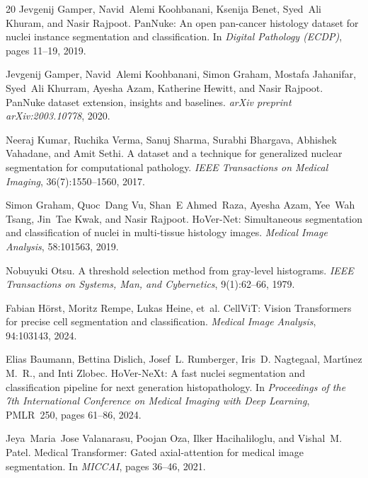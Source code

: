 \documentclass{article}
\begin{document}
{\begin{thebibliography}{20}
Jevgenij Gamper, Navid~Alemi Koohbanani, Ksenija Benet, Syed~Ali Khuram, and Nasir Rajpoot.
\newblock PanNuke: An open pan-cancer histology dataset for nuclei instance segmentation and classification.
\newblock In \emph{Digital Pathology (ECDP)}, pages 11--19, 2019.

Jevgenij Gamper, Navid~Alemi Koohbanani, Simon Graham, Mostafa Jahanifar, Syed~Ali Khurram, Ayesha Azam, Katherine Hewitt, and Nasir Rajpoot.
\newblock PanNuke dataset extension, insights and baselines.
\newblock \emph{arXiv preprint arXiv:2003.10778}, 2020.

Neeraj Kumar, Ruchika Verma, Sanuj Sharma, Surabhi Bhargava, Abhishek Vahadane, and Amit Sethi.
\newblock A dataset and a technique for generalized nuclear segmentation for computational pathology.
\newblock \emph{IEEE Transactions on Medical Imaging}, 36(7):1550--1560, 2017.

Simon Graham, Quoc~Dang Vu, Shan~E Ahmed~Raza, Ayesha Azam, Yee~Wah Tsang, Jin~Tae Kwak, and Nasir Rajpoot.
\newblock HoVer-Net: Simultaneous segmentation and classification of nuclei in multi-tissue histology images.
\newblock \emph{Medical Image Analysis}, 58:101563, 2019.

Nobuyuki Otsu.
\newblock A threshold selection method from gray-level histograms.
\newblock \emph{IEEE Transactions on Systems, Man, and Cybernetics}, 9(1):62--66, 1979.

Fabian Hörst, Moritz Rempe, Lukas Heine, et~al.
\newblock CellViT: Vision Transformers for precise cell segmentation and classification.
\newblock \emph{Medical Image Analysis}, 94:103143, 2024.

Elias Baumann, Bettina Dislich, Josef~L. Rumberger, Iris~D. Nagtegaal, Mart{\'\i}nez M.~R., and Inti Zlobec.
\newblock HoVer-NeXt: A fast nuclei segmentation and classification pipeline for next generation histopathology.
\newblock In \emph{Proceedings of the 7th International Conference on Medical Imaging with Deep Learning}, PMLR~250, pages 61--86, 2024.

Jeya~Maria~Jose Valanarasu, Poojan Oza, Ilker Hacihaliloglu, and Vishal~M. Patel.
\newblock Medical Transformer: Gated axial-attention for medical image segmentation.
\newblock In \emph{MICCAI}, pages 36--46, 2021.


\end{thebibliography}}
\end{document}

